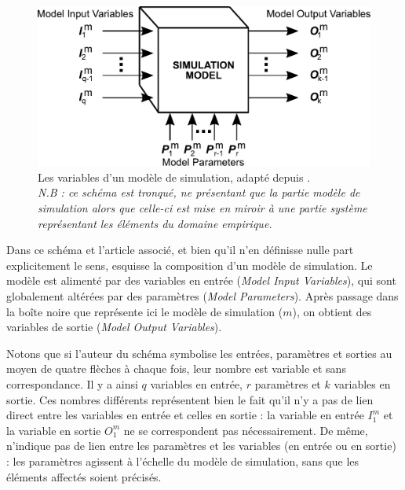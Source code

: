 \begin{figure}[H]
	\centering
	\includegraphics[width=\linewidth]{img/schema_parametres_balci.pdf}
	\caption[Les variables d'un modèle de simulation selon \citeauthor{balci_validation_1994}]{Les variables d'un modèle de simulation, adapté depuis \textcite[122]{balci_validation_1994}.\\
	\textit{N.B : ce schéma est tronqué, ne présentant que la partie \og modèle de simulation\fg{} alors que celle-ci est mise en miroir à une partie \og système\fg{} représentant les éléments du domaine empirique.}}
	\label{fig:parametres-Balci} 
\end{figure}

Dans ce schéma et l'article associé, et bien qu'il n'en définisse nulle part explicitement le sens, \citeauthor{balci_validation_1994} esquisse la composition d'un modèle de simulation.
Le modèle est alimenté par des variables en entrée (\textit{Model Input Variables}), qui sont globalement altérées par des paramètres (\textit{Model Parameters}).
Après passage dans la \og boîte noire\fg{} que représente ici le modèle de simulation ($m$), on obtient des variables de sortie (\textit{Model Output Variables}).

Notons que si l'auteur du schéma symbolise les entrées, paramètres et sorties au moyen de quatre flèches à chaque fois, leur nombre est variable et sans correspondance.
Il y a ainsi $q$ variables en entrée, $r$ paramètres et $k$ variables en sortie.
Ces nombres différents représentent bien le fait qu'il n'y a pas de lien direct entre les variables en entrée et celles en sortie : la variable en entrée $I_{1}^m$ et la variable en sortie $O_{1}^m$ ne se correspondent pas nécessairement.
De même, \citeauthor{balci_validation_1994} n'indique pas de lien entre les paramètres et les variables (en entrée ou en sortie) : les paramètres agissent à l'échelle du modèle de simulation, sans que les éléments affectés soient précisés.

